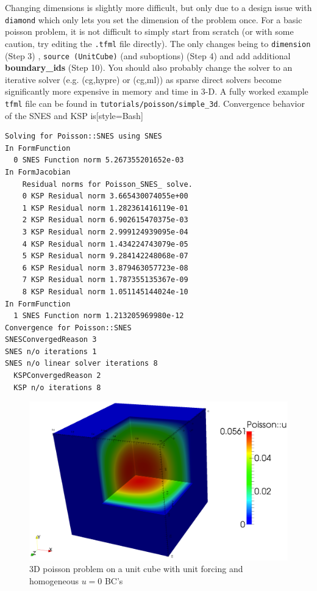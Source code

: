 Changing dimensions is slightly more difficult, but only due to a
design issue with \texttt{diamond} which only lets you set the
dimension of the problem once.  For a basic poisson problem, it is not
difficult to simply start from scratch (or with some caution, try
editing the \texttt{.tfml} file directly). The only changes being to
\texttt{dimension} (Step 3) , \texttt{source (UnitCube)} (and
suboptions) (Step 4)  and
add additional \textbf{boundary\_ids} (Step 10).  You should also probably change
the solver to an iterative solver (e.g. (cg,hypre) or (cg,ml)) as
sparse direct solvers become significantly more expensive in memory
and time in 3-D.  A fully worked example \texttt{tfml} file can be
found in \texttt{tutorials/poisson/simple\_3d}.
Convergence behavior of the SNES and KSP is[style=Bash]
\begin{lstlisting}[style=Bash]
Solving for Poisson::SNES using SNES
In FormFunction
  0 SNES Function norm 5.267355201652e-03 
In FormJacobian
    Residual norms for Poisson_SNES_ solve.
    0 KSP Residual norm 3.665430074055e+00 
    1 KSP Residual norm 1.282361416119e-01 
    2 KSP Residual norm 6.902615470375e-03 
    3 KSP Residual norm 2.999124939095e-04 
    4 KSP Residual norm 1.434224743079e-05 
    5 KSP Residual norm 9.284142248068e-07 
    6 KSP Residual norm 3.879463057723e-08 
    7 KSP Residual norm 1.787355135367e-09 
    8 KSP Residual norm 1.051145144024e-10 
In FormFunction
  1 SNES Function norm 1.213205969980e-12 
Convergence for Poisson::SNES
SNESConvergedReason 3
SNES n/o iterations 1
SNES n/o linear solver iterations 8
  KSPConvergedReason 2
  KSP n/o iterations 8
\end{lstlisting}
\begin{figure}[ht!]
  \centering
  \includegraphics[width=.7\textwidth]{figures/poisson_simple_3d}
  \caption{3D poisson problem on a unit cube with unit forcing and homogeneous $u=0$ BC's}
  \label{fig:poisson-3D}
\end{figure}

